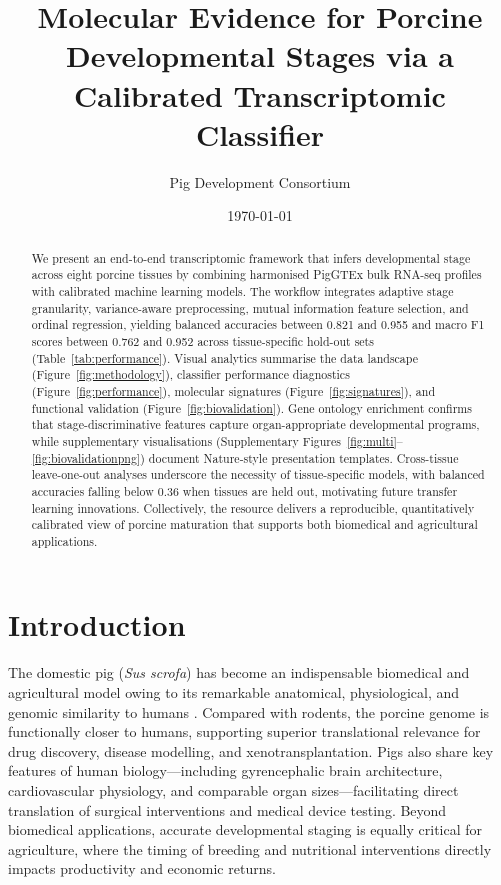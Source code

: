 \documentclass[11pt]{article}
\title{Molecular Evidence for Porcine Developmental Stages via a Calibrated Transcriptomic Classifier}
\author{Pig Development Consortium}
\date{\today}
\begin{document}
\maketitle

\begin{abstract}
We present an end-to-end transcriptomic framework that infers developmental stage across eight porcine tissues by combining harmonised PigGTEx bulk RNA-seq profiles with calibrated machine learning models. The workflow integrates adaptive stage granularity, variance-aware preprocessing, mutual information feature selection, and ordinal regression, yielding balanced accuracies between 0.821 and 0.955 and macro F1 scores between 0.762 and 0.952 across tissue-specific hold-out sets (Table~\ref{tab:performance}). Visual analytics summarise the data landscape (Figure~\ref{fig:methodology}), classifier performance diagnostics (Figure~\ref{fig:performance}), molecular signatures (Figure~\ref{fig:signatures}), and functional validation (Figure~\ref{fig:biovalidation}). Gene ontology enrichment confirms that stage-discriminative features capture organ-appropriate developmental programs, while supplementary visualisations (Supplementary Figures~\ref{fig:multi}--\ref{fig:biovalidationpng}) document Nature-style presentation templates. Cross-tissue leave-one-out analyses underscore the necessity of tissue-specific models, with balanced accuracies falling below 0.36 when tissues are held out, motivating future transfer learning innovations. Collectively, the resource delivers a reproducible, quantitatively calibrated view of porcine maturation that supports both biomedical and agricultural applications.
\end{abstract}

\section{Introduction}
The domestic pig (\textit{Sus scrofa}) has become an indispensable biomedical and agricultural model owing to its remarkable anatomical, physiological, and genomic similarity to humans \cite{swindle2012,lunney2021}. Compared with rodents, the porcine genome is functionally closer to humans, supporting superior translational relevance for drug discovery, disease modelling, and xenotransplantation. Pigs also share key features of human biology---including gyrencephalic brain architecture, cardiovascular physiology, and comparable organ sizes---facilitating direct translation of surgical interventions and medical device testing. Beyond biomedical applications, accurate developmental staging is equally critical for agriculture, where the timing of breeding and nutritional interventions directly impacts productivity and economic returns.
\end{document}
